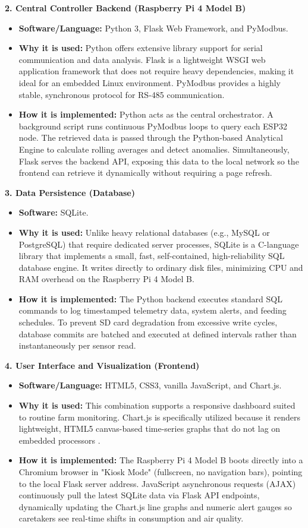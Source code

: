 \textbf{2. Central Controller Backend (Raspberry Pi 4 Model B)}
\begin{itemize}
  \item \textbf{Software/Language:} Python 3, Flask Web Framework, and PyModbus.
  \item \textbf{Why it is used:} Python offers extensive library support for serial communication and data analysis. Flask is a lightweight WSGI web application framework that does not require heavy dependencies, making it ideal for an embedded Linux environment. PyModbus provides a highly stable, synchronous protocol for RS-485 communication.
  \item \textbf{How it is implemented:} Python acts as the central orchestrator. A background script runs continuous PyModbus loops to query each ESP32 node. The retrieved data is passed through the Python-based Analytical Engine to calculate rolling averages and detect anomalies. Simultaneously, Flask serves the backend API, exposing this data to the local network so the frontend can retrieve it dynamically without requiring a page refresh.
\end{itemize}

\textbf{3. Data Persistence (Database)}
\begin{itemize}
  \item \textbf{Software:} SQLite.
  \item \textbf{Why it is used:} Unlike heavy relational databases (e.g., MySQL or PostgreSQL) that require dedicated server processes, SQLite is a C-language library that implements a small, fast, self-contained, high-reliability SQL database engine. It writes directly to ordinary disk files, minimizing CPU and RAM overhead on the Raspberry Pi 4 Model B.
  \item \textbf{How it is implemented:} The Python backend executes standard SQL commands to log timestamped telemetry data, system alerts, and feeding schedules. To prevent SD card degradation from excessive write cycles, database commits are batched and executed at defined intervals rather than instantaneously per sensor read.
\end{itemize}

\textbf{4. User Interface and Visualization (Frontend)}
\begin{itemize}
  \item \textbf{Software/Language:} HTML5, CSS3, vanilla JavaScript, and Chart.js.
  \item \textbf{Why it is used:} This combination supports a responsive dashboard suited to routine farm monitoring. Chart.js is specifically utilized because it renders lightweight, HTML5 canvas-based time-series graphs that do not lag on embedded processors \cite{everypig_nd,jygatech2026vision}.
  \item \textbf{How it is implemented:} The Raspberry Pi 4 Model B boots directly into a Chromium browser in "Kiosk Mode" (fullscreen, no navigation bars), pointing to the local Flask server address. JavaScript asynchronous requests (AJAX) continuously pull the latest SQLite data via Flask API endpoints, dynamically updating the Chart.js line graphs and numeric alert gauges so caretakers see real-time shifts in consumption and air quality.
\end{itemize}

